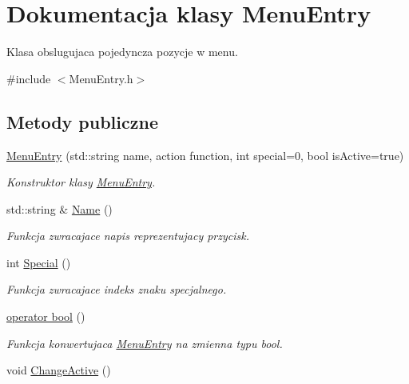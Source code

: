 \hypertarget{class_menu_entry}{}\section{Dokumentacja klasy Menu\+Entry}
\label{class_menu_entry}


Klasa obslugujaca pojedyncza pozycje w menu.  




{\ttfamily \#include $<$Menu\+Entry.\+h$>$}

\subsection*{Metody publiczne}
\begin{DoxyCompactItemize}
\item 
\hyperlink{class_menu_entry_a400100dee10c9aab7af558f854120fbd}{Menu\+Entry} (std\+::string name, action function, int special=0, bool is\+Active=true)
\begin{DoxyCompactList}\small\item\em Konstruktor klasy \hyperlink{class_menu_entry}{Menu\+Entry}. \end{DoxyCompactList}\item 
std\+::string \& \hyperlink{class_menu_entry_a94ce04cb1d1a97506416ab206665ed22}{Name} ()
\begin{DoxyCompactList}\small\item\em Funkcja zwracajace napis reprezentujacy przycisk. \end{DoxyCompactList}\item 
int \hyperlink{class_menu_entry_a8c3eb591798f523d010c21cbf8f2d6f7}{Special} ()
\begin{DoxyCompactList}\small\item\em Funkcja zwracajace indeks znaku specjalnego. \end{DoxyCompactList}\item 
\hyperlink{class_menu_entry_adb576d6c52b0065a9a3e0f200799ab19}{operator bool} ()
\begin{DoxyCompactList}\small\item\em Funkcja konwertujaca \hyperlink{class_menu_entry}{Menu\+Entry} na zmienna typu bool. \end{DoxyCompactList}\item 
\hypertarget{class_menu_entry_a2e8401a0092bd024580cd4f3c17820f9}{}void \hyperlink{class_menu_entry_a2e8401a0092bd024580cd4f3c17820f9}{Change\+Active} ()\label{class_menu_entry_a2e8401a0092bd024580cd4f3c17820f9}


\end{DoxyCompactItemize}

